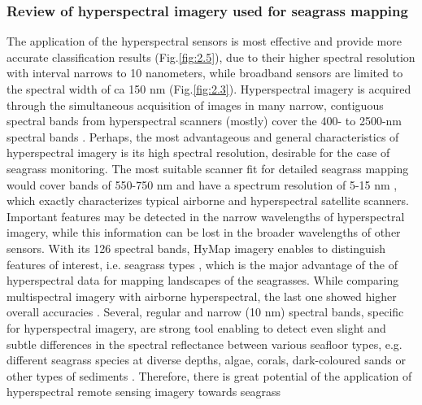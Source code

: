 \documentclass[11pt]{article}
\begin{document}
\subsubsection[Review of hyperspectral imagery used for seagrass mapping]{Review of hyperspectral imagery used for seagrass mapping}\label{sec:2.4.2}

The application of the hyperspectral sensors \label{page-20} is most effective and provide more accurate classification
results  (Fig.\ref{fig:2.5}), due to their higher spectral resolution \cite{Bharathi03}\label{Bharathi03} with interval
narrows to 10 nanometers, while broadband sensors are limited to the spectral width of ca
150 nm  (Fig.\ref{fig:2.3}). 
Hyperspectral imagery is acquired through the simultaneous acquisition of images in many
narrow, contiguous spectral bands from hyperspectral scanners (mostly) cover the 400-
to 2500-nm spectral bands \cite{Schmidt03}\label{Schmidt03}.
Perhaps, the most advantageous and general characteristics of hyperspectral imagery is its
high spectral resolution, desirable for the case of seagrass monitoring. 
The most suitable scanner fit for detailed seagrass mapping would cover bands of 550-750 nm and have a spectrum
resolution of 5-15 nm \cite{Fyfe04}\label{Fyfe04}, which exactly characterizes typical airborne and
hyperspectral satellite scanners. Important features may be detected in the narrow
wavelengths of hyperspectral imagery, while this information can be lost in the broader
wavelengths of other sensors. With its 126 spectral bands, \ac{HyMap} imagery enables to
distinguish features of interest, i.e. seagrass types \cite{Peneva07}\label{Peneva07}, which is the major
advantage of the of hyperspectral data for mapping landscapes of the seagrasses.
While comparing multispectral imagery with airborne hyperspectral, the last one showed higher
overall accuracies \cite{Phinn08}\label{Phinn08}. Several, regular and narrow (10 nm) spectral bands\label{sec:2.4.2}, specific for
hyperspectral imagery, are strong tool enabling to detect even slight and subtle differences in the
spectral reflectance between various seafloor types, e.g. different seagrass species at diverse depths,
algae, corals, dark-coloured sands or other types of sediments \cite{Hochberg03a}\label{Hochberg03a}. 
Therefore, there is great potential of the application of hyperspectral remote sensing imagery towards seagrass
\end{document}
